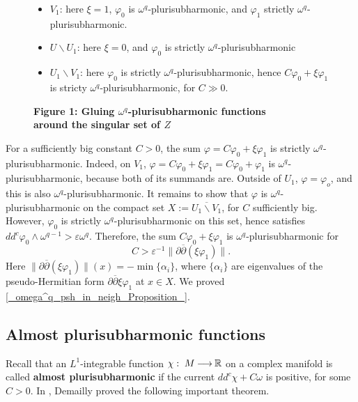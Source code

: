 \documentclass[11pt]{article}
\numberwithin{equation}{section}
\newcommand{\arrow}{{\:\longrightarrow\:}}
\newcommand{\R}{{\Bbb R}}
\newcommand{\6}{\partial}
\renewcommand{\bar}{\overline}
\renewcommand{\phi}{\varphi}
\renewcommand{\epsilon}{\varepsilon}
\newcounter{theorem}[section]
\def\blacksquare{\hbox{\vrule width 5pt height 5pt depth 0pt}}
\def\endproof{\blacksquare}
\begin{document}
\begin{figure}[ht]
\begin{center}
{\parbox[t]{0.7\linewidth}{
\begin{itemize}
\item $V_1$: here $\xi=1$, $\phi_0$ is
  $\omega^q$-plurisubharmonic, and $\phi_1$  strictly 
  $\omega^q$-plurisubharmonic.
\item $U\backslash U_1$: here $\xi=0$, and $\phi_0$ is
strictly  $\omega^q$-plurisubharmonic
\item $U_1\backslash V_1$: here $\phi_0$ is strictly 
  $\omega^q$-plurisubharmonic, hence $C\phi_0 + \xi\phi_1$
is stricty $\omega^q$-plu\-ri\-sub\-har\-monic, for $C\gg 0$.
\end{itemize}}}
\parbox[t]{0.65\linewidth}{{\bf \scriptsize  Figure 1: Gluing
  $\omega^q$-plurisubharmonic functions\\
around the singular set of $Z$}}
\end{center}
\end{figure}

For a sufficiently big constant $C>0$, the sum 
$\phi = C\phi_0 + \xi \phi_1$ is strictly
$\omega^q$-plurisubharmonic. Indeed, on $V_1$,
$\phi= C\phi_0 + \xi \phi_1= C\phi_0 + \phi_1$ 
is  $\omega^q$-plurisubharmonic,
because both of its summands are. Outside of
$U_1$, $\phi= \phi_o$, and this is also 
$\omega^q$-plurisubharmonic. It remains
to show that $\phi$ is $\omega^q$-plurisubharmonic
on the compact set $X:= \overline{U_1\backslash V_1}$,
for $C$ sufficiently big. However, $\phi_0$
is strictly $\omega^q$-plurisubharmonic on this set,
hence satisfies $dd^c \phi_0 \wedge \omega^{q-1}> \epsilon \omega^q$.
Therefore, the sum $C\phi_0 + \xi \phi_1$ 
is  $\omega^q$-plurisubharmonic for 
\[ C> \epsilon^{-1} \|\6\bar\6(\xi \phi_1)\|.\]
Here $\|\6\bar\6(\xi \phi_1)\|(x)=- \min \{\alpha_i\}$,
where $\{\alpha_i\}$ are eigenvalues of the pseudo-Hermitian
form $\6\bar\6\xi \phi_1$ at $x\in X$. We proved
\ref{_omega^q_psh_in_neigh_Proposition_}. \endproof

\subsection{Almost plurisubharmonic functions}
\label{_almost_psh_Subsection_}

Recall that an $L^1$-integrable function 
$\chi:\; M \arrow \R$ on a complex manifold is called
{\bf almost plurisubharmonic} if 
the current $dd^c \chi+ C\omega$ is positive,
for some $C>0$. In \cite{_Demailly_1982_}, Demailly proved the following 
important theorem.
\end{document}
